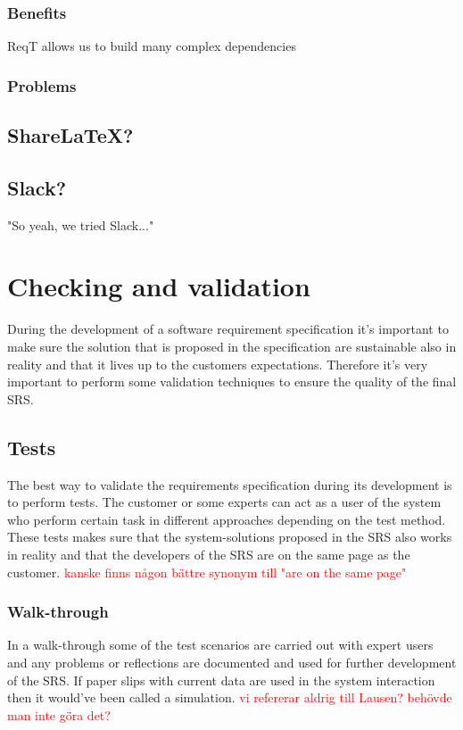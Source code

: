 \documentclass[10pt]{article}
\newcommand\todo[1]{\textcolor{red}{#1}}
\begin{document}
\subsubsection{Benefits}
ReqT allows us to build many complex dependencies
\subsubsection{Problems}

\subsection{ShareLaTeX?}

\subsection{Slack?}
"So yeah, we tried Slack..."

\section{Checking and validation}
\noindent
During the development of a software requirement specification it's important to make sure the solution that is proposed in the specification are sustainable also in reality and that it lives up to the customers expectations. Therefore it's very important to perform some validation techniques to ensure the quality of the final SRS.
\subsection{Tests}
The best way to validate the requirements specification during its development is to perform tests. The customer or some experts can act as a user of the system who perform certain task in different approaches depending on the test method. These tests makes sure that the system-solutions proposed in the SRS also works in reality and that the developers of the SRS are on the same page as the customer.
\todo{kanske finns någon bättre synonym till "are on the same page"}
\subsubsection{Walk-through}
In a walk-through some of the test scenarios are carried out with expert users and any problems or reflections are documented and used for further development of the SRS. If paper slips with current data are used in the system interaction then it would've been called a simulation.
\todo{vi refererar aldrig till Lausen? behövde man inte göra det?}
\end{document}
